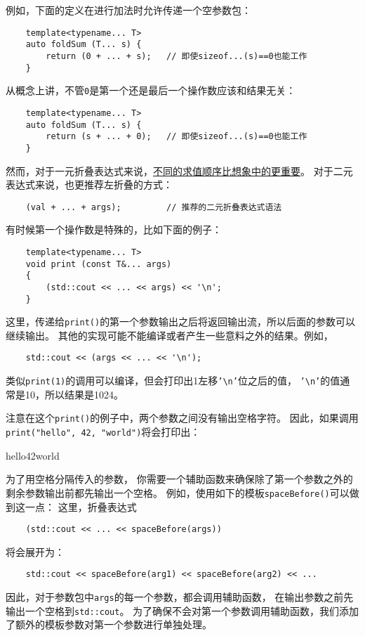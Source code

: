例如，下面的定义在进行加法时允许传递一个空参数包：
\begin{lstlisting}
    template<typename... T>
    auto foldSum (T... s) {
        return (0 + ... + s);   // 即使sizeof...(s)==0也能工作
    }
\end{lstlisting}
从概念上讲，不管\texttt{0}是第一个还是最后一个操作数应该和结果无关：
\begin{lstlisting}
    template<typename... T>
    auto foldSum (T... s) {
        return (s + ... + 0);   // 即使sizeof...(s)==0也能工作
    }
\end{lstlisting}
然而，对于一元折叠表达式来说，\hyperref[ch11.2]{不同的求值顺序比想象中的更重要}。
对于二元表达式来说，也更推荐左折叠的方式：
\begin{lstlisting}
    (val + ... + args);         // 推荐的二元折叠表达式语法
\end{lstlisting}
有时候第一个操作数是特殊的，比如下面的例子：
\label{输出任意个参数的print}
\begin{lstlisting}
    template<typename... T>
    void print (const T&... args)
    {
        (std::cout << ... << args) << '\n';
    }
\end{lstlisting}
这里，传递给\texttt{print()}的第一个参数输出之后将返回输出流，所以后面的参数可以继续输出。
其他的实现可能不能编译或者产生一些意料之外的结果。例如，
\begin{lstlisting}
    std::cout << (args << ... << '\n');
\end{lstlisting}
类似\texttt{print(1)}的调用可以编译，但会打印出1左移\texttt{'\textbackslash n'}位之后的值，
\texttt{'\textbackslash n'}的值通常是10，所以结果是1024。

注意在这个\texttt{print()}的例子中，两个参数之间没有输出空格字符。
因此，如果调用\texttt{print("hello", 42, "world")}将会打印出：
\begin{blacklisting}
    hello42world
\end{blacklisting}
为了用空格分隔传入的参数，
你需要一个辅助函数来确保除了第一个参数之外的剩余参数输出前都先输出一个空格。
例如，使用如下的模板\texttt{spaceBefore()}可以做到这一点：
这里，折叠表达式
\begin{lstlisting}
    (std::cout << ... << spaceBefore(args))
\end{lstlisting}
将会展开为：
\begin{lstlisting}
    std::cout << spaceBefore(arg1) << spaceBefore(arg2) << ...
\end{lstlisting}
因此，对于参数包中\texttt{args}的每一个参数，都会调用辅助函数，
在输出参数之前先输出一个空格到\texttt{std::cout}。
为了确保不会对第一个参数调用辅助函数，我们添加了额外的模板参数对第一个参数进行单独处理。

